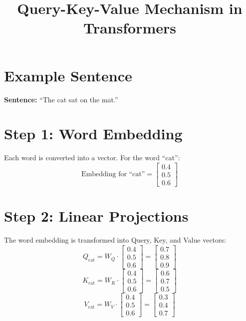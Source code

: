 \documentclass{article}
\begin{document}
\title{Query-Key-Value Mechanism in Transformers}
\author{}
\date{}
\maketitle

\section*{Example Sentence}
\textbf{Sentence:} ``The cat sat on the mat.''

\section*{Step 1: Word Embedding}
Each word is converted into a vector. For the word ``cat'':
\[
\text{Embedding for ``cat''} = \begin{bmatrix} 0.4 \\ 0.5 \\ 0.6 \end{bmatrix}
\]

\section*{Step 2: Linear Projections}
The word embedding is transformed into Query, Key, and Value vectors:
\[
Q_{\text{cat}} = W_Q \cdot \begin{bmatrix} 0.4 \\ 0.5 \\ 0.6 \end{bmatrix} = \begin{bmatrix} 0.7 \\ 0.8 \\ 0.9 \end{bmatrix}
\]
\[
K_{\text{cat}} = W_K \cdot \begin{bmatrix} 0.4 \\ 0.5 \\ 0.6 \end{bmatrix} = \begin{bmatrix} 0.6 \\ 0.7 \\ 0.5 \end{bmatrix}
\]
\[
V_{\text{cat}} = W_V \cdot \begin{bmatrix} 0.4 \\ 0.5 \\ 0.6 \end{bmatrix} = \begin{bmatrix} 0.3 \\ 0.4 \\ 0.7 \end{bmatrix}
\]
\end{document}
